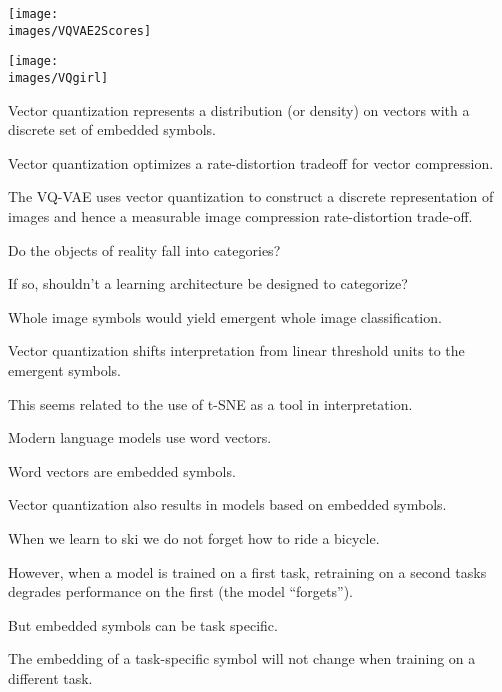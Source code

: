 {\vfill
\centerline{\texttt{[image: \\images/VQVAE2Scores]}}


\vfill
\centerline{\texttt{[image: \\images/VQgirl]}}



Vector quantization represents a distribution (or density) on vectors with a discrete set of embedded symbols.

\vfill
Vector quantization optimizes a rate-distortion tradeoff for vector compression.

\vfill
The VQ-VAE uses vector quantization to construct a discrete representation of images and hence a measurable image compression rate-distortion trade-off.


Do the objects of reality fall into categories?

\vfill
If so, shouldn't a learning architecture be designed to categorize?

\vfill
Whole image symbols would yield emergent whole image classification.


Vector quantization shifts interpretation from linear threshold units to the emergent symbols.

\vfill
This seems related to the use of t-SNE as a tool in interpretation.



Modern language models use word vectors.

\vfill
Word vectors are embedded symbols.

\vfill
Vector quantization also results in models based on embedded symbols.

When we learn to ski we do not forget how to ride a bicycle.

\vfill
However, when a model is trained on a first task, retraining on a second tasks degrades performance on the first (the model ``forgets'').

\vfill
But embedded symbols can be task specific.

\vfill
The embedding of a task-specific symbol will not change when training on a different task.



}
